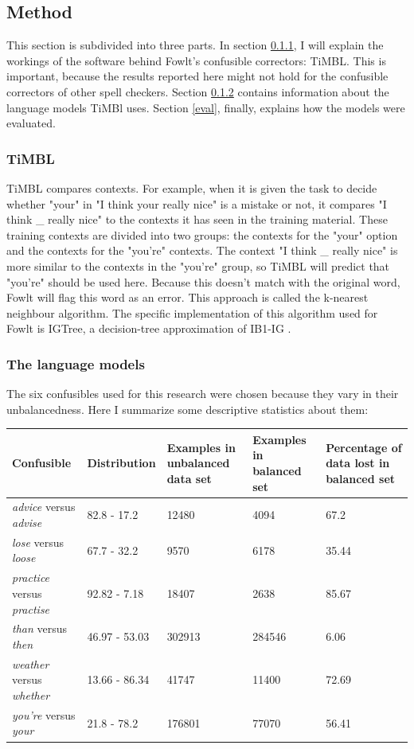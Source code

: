 \documentclass[12pt]{article}
\begin{document}

\subsection{Method}
This section is subdivided into three parts. In section \ref{timbl}, I will explain the workings of the software behind Fowlt's confusible correctors: TiMBL. This is important, because the results reported here might not hold for the confusible correctors of other spell checkers. Section \ref{langmod} contains information about the language models  TiMBl uses. Section \ref{eval}, finally, explains how the models were evaluated.


\subsubsection{TiMBL} \label{timbl}
TiMBL compares contexts. For example, when it is given the task to decide whether "your" in "I think your really nice" is a mistake or not, it compares "I think \_ really nice" to the contexts it has seen in the training material. These training contexts are divided into two groups: the contexts for the "your" option and the contexts for the "you're" contexts. The context "I think \_ really nice" is more similar to the contexts in the "you're" group, so TiMBL will predict that "you're" should be used here. Because this doesn't match with the original word, Fowlt will flag this word as an error. This approach is called the k-nearest neighbour algorithm. The specific implementation of this algorithm used for Fowlt is IGTree, a decision-tree approximation of IB1-IG \citep{dvdbw97}.

\subsubsection{The language models} \label{langmod}

The six confusibles used for this research were chosen because they vary in their unbalancedness. Here I summarize some descriptive statistics about them:

\begin{table}[h] \footnotesize
\begin{tabular}{|l|l|p{3cm}|l|p{3cm}|}
\hline
Confusible&Distribution&Examples in unbalanced data set&Examples in balanced set&Percentage of data lost in balanced set\\
\hline
\emph{advice} versus \emph{advise}&82.8 - 17.2&12480&4094&67.2\\
\emph{lose} versus \emph{loose}&67.7 - 32.2&9570&6178&35.44\\
\emph{practice} versus \emph{practise}&92.82 - 7.18&18407&2638&85.67\\
\emph{than} versus \emph{then}&46.97 - 53.03&302913&284546&6.06\\
\emph{weather} versus \emph{whether}&13.66 - 86.34&41747&11400&72.69\\
\emph{you're} versus \emph{your}&21.8 - 78.2&176801&77070&56.41\\
\hline
\end{tabular}
\end{table}
\end{document}

